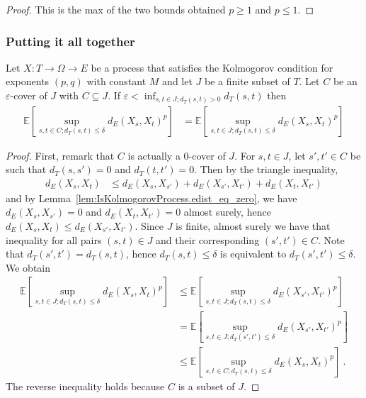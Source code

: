 \begin{proof}\leanok
This is the max of the two bounds obtained $p \ge 1$ and $p \le 1$.
\end{proof}



\subsubsection{Putting it all together}


\begin{lemma}\label{lem:lintegral_sup_cover_eq_of_lt_iInf_dist}
  \leanok
Let $X : T \to \Omega \to E$ be a process that satisfies the Kolmogorov condition for exponents $(p,q)$ with constant $M$ and let $J$ be a finite subset of $T$.
Let $C$ be an $\varepsilon$-cover of $J$ with $C \subseteq J$.
If $\varepsilon < \inf_{s, t \in J; d_T(s, t)>0} d_T(s, t)$ then
\begin{align*}
  \mathbb{E}\left[ \sup_{s, t \in C; d_T(s, t) \le \delta} d_E(X_s, X_t)^p \right]
  &= \mathbb{E}\left[ \sup_{s, t \in J; d_T(s, t) \le \delta} d_E(X_s, X_t)^p \right]
\end{align*}
\end{lemma}

\begin{proof}\leanok
First, remark that $C$ is actually a $0$-cover of $J$.
For $s, t \in J$, let $s', t' \in C$ be such that $d_T(s, s') = 0$ and $d_T(t, t') = 0$.
Then by the triangle inequality,
\begin{align*}
  d_E(X_s, X_t)
  &\le d_E(X_s, X_{s'}) + d_E(X_{s'}, X_{t'}) + d_E(X_t, X_{t'})
\end{align*}
and by Lemma~\ref{lem:IsKolmogorovProcess.edist_eq_zero}, we have $d_E(X_s, X_{s'}) = 0$ and $d_E(X_t, X_{t'}) = 0$ almost surely, hence $d_E(X_s, X_t) \le d_E(X_{s'}, X_{t'})$.
Since $J$ is finite, almost surely we have that inequality for all pairs $(s, t) \in J$ and their corresponding $(s', t') \in C$.
Note that $d_T(s', t') = d_T(s, t)$, hence $d_T(s, t) \le \delta$ is equivalent to $d_T(s', t') \le \delta$.
We obtain
\begin{align*}
  \mathbb{E}\left[ \sup_{s, t \in J; d_T(s, t) \le \delta} d_E(X_s, X_t)^p \right]
  &\le \mathbb{E}\left[ \sup_{s, t \in J; d_T(s, t) \le \delta} d_E(X_{s'}, X_{t'})^p \right]
  \\
  &= \mathbb{E}\left[ \sup_{s, t \in J; d_T(s', t') \le \delta} d_E(X_{s'}, X_{t'})^p \right]
  \\
  &\le \mathbb{E}\left[ \sup_{s, t \in C; d_T(s, t) \le \delta} d_E(X_s, X_t)^p \right]
  \: .
\end{align*}
The reverse inequality holds because $C$ is a subset of $J$.
\end{proof}


